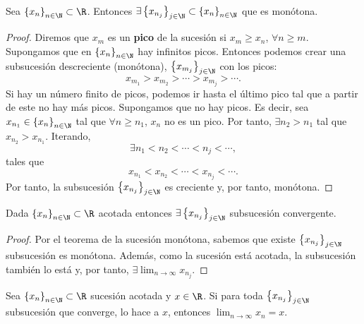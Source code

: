 \begin{ftheorem}
	\normalfont Sea $\displaystyle \left\{ x_{n}\right\} _{n\in\N}\subset\R $. Entonces $\displaystyle \exists \left\{ x_{n_{j}}\right\}_{j\in\N}\subset \left\{ x_{n}\right\} _{n\in\N} $ que es monótona.
\end{ftheorem}

\begin{proof}
	Diremos que $\displaystyle x_{m} $ es un \textbf{pico} de la sucesión si $\displaystyle x_{m} \geq x_{n} $, $\displaystyle \forall n \geq m $. Supongamos que en $\displaystyle \left\{ x_{n}\right\} _{n\in\N} $ hay infinitos picos. Entonces podemos crear una subsucesión descreciente (monótona), $\displaystyle \left\{ x_{m_{j}}\right\} _{j\in\N} $ con los picos:
	\[x_{m_{1}} > x_{m_{2}} > \cdots > x_{m_{j}} > \cdots .\]
	Si hay un número finito de picos, podemos ir hasta el último pico tal que a partir de este no hay más picos. Supongamos que no hay picos. Es decir, sea $\displaystyle x_{n_{1}} \in \left\{ x_{n}\right\} _{n\in\N} $ tal que $\displaystyle \forall n \geq n_{1} $, $\displaystyle x_{n} $ no es un pico. Por tanto, $\displaystyle \exists n_{2} > n_{1} $ tal que $\displaystyle x_{n_{2}} > x_{n_{1}} $. Iterando, 
	\[\exists n_{1} < n_{2} < \cdots < n_{j} < \cdots, \]
tales que
\[x_{n_{1}} < x_{n_{2}} < \cdots < x_{n_{j}} < \cdots .\]
Por tanto, la subsucesión $\displaystyle \left\{ x_{n_{j}}\right\} _{j\in\N} $ es creciente y, por tanto, monótona. 
\end{proof}

\begin{ftheorem}
	\normalfont Dada $\displaystyle \left\{ x_{n}\right\} _{n\in\N}\subset\R $ acotada entonces $\displaystyle \exists \left\{ x_{n_{j}}\right\} _{j\in\N} $ subsucesión convergente.
\end{ftheorem}

\begin{proof}
	Por el teorema de la sucesión monótona, sabemos que existe $\displaystyle \left\{ x_{n_{j}}\right\} _{j\in\N} $ subsucesión es monótona. Además, como la sucesión está acotada, la subsucesión también lo está y, por tanto, $\displaystyle \exists \lim_{n \to \infty}x_{n_{j}} $.
\end{proof}

\begin{ftheorem}[]
	\normalfont Sea $\displaystyle \left\{ x_{n}\right\} _{n\in\N}\subset\R $ sucesión acotada y $\displaystyle x \in \R $. Si para toda $\displaystyle \left\{ x_{n_{j}}\right\} _{j\in\N} $ subsucesión que converge, lo hace a $\displaystyle x $, entonces $\displaystyle \lim_{n \to \infty}x_{n} = x $.
\end{ftheorem}

